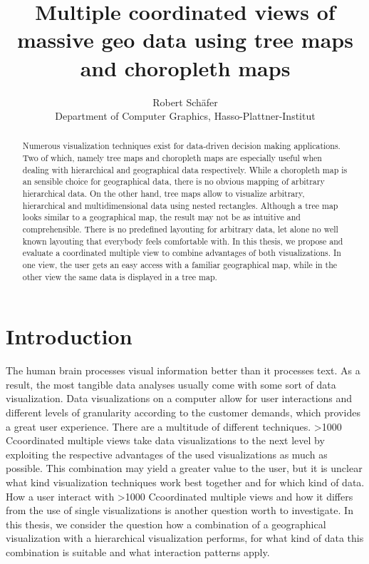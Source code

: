 \documentclass{article}
\begin{document}
\title{Multiple coordinated views of massive geo data using tree maps and choropleth maps}
\author{Robert Schäfer\\ Department of Computer Graphics, Hasso-Plattner-Institut}
\maketitle

\newcommand{\rufu}{``Rundfunk \textsc{MITBESTIMMEN}''}
\newcommand\hmm[1]{\ifnum\ifhmode\spacefactor\else2000\fi>1000 \uppercase{#1}\else#1\fi}
\newcommand{\cmv}{\hmm{c}oordinated multiple view}
\newcommand{\cmvs}{\hmm{c}oordinated multiple views}
\newcommand{\map}{2D Map}
\newcommand{\maps}{2D Maps}
\newcommand{\tmap}{2.5 Tree Map}
\newcommand{\tmaps}{2.5 Tree Maps}

\begin{abstract}
  Numerous visualization techniques exist for data-driven decision making applications.
  Two of which, namely tree maps and choropleth maps are especially useful when dealing with hierarchical and geographical data respectively.
  While a choropleth map is an sensible choice for geographical data, there is no obvious mapping of arbitrary hierarchical data.
  On the other hand, tree maps allow to visualize arbitrary, hierarchical and multidimensional data using nested rectangles.
  Although a tree map looks similar to a geographical map, the result may not be as intuitive and comprehensible.
  There is no predefined layouting for arbitrary data, let alone no well known layouting that everybody feels comfortable with.
  In this thesis, we propose and evaluate a coordinated multiple view to combine advantages of both visualizations.
  In one view, the user gets an easy access with a familiar geographical map, while in the other view the same data is displayed in a tree map.
\end{abstract}

\section{Introduction}
The human brain processes visual information better than it processes text.
As a result, the most tangible data analyses usually come with some sort of data visualization.
Data visualizations on a computer allow for user interactions and different levels of granularity according to the customer demands, which provides a great user experience.
There are a multitude of different techniques.
\cmvs{} take data visualizations to the next level by exploiting the respective advantages of the used visualizations as much as possible.
This combination may yield a greater value to the user, but it is unclear what kind visualization techniques work best together and for which kind of data.
How a user interact with \cmvs{} and how it differs from the use of single visualizations is another question worth to investigate.
In this thesis, we consider the question how a combination of a geographical visualization with a hierarchical visualization performs, for what kind of data this combination is suitable and what interaction patterns apply.
\end{document}
